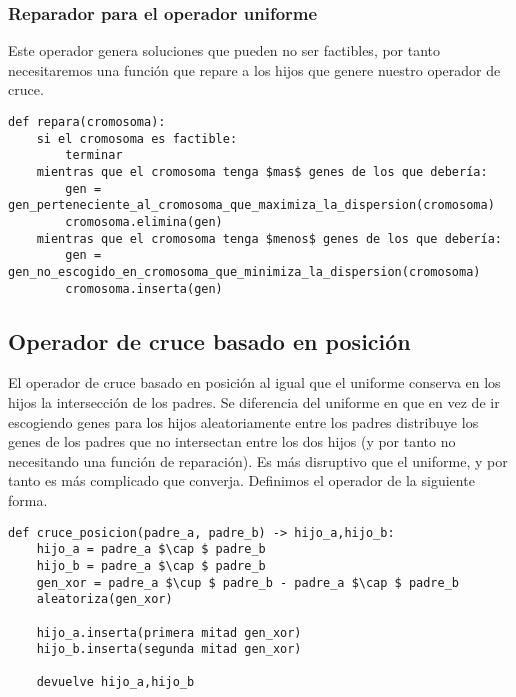 \begin{minipage}{\textwidth}

\subsubsection{Reparador para el operador uniforme}

Este operador genera soluciones que pueden no ser factibles, por tanto necesitaremos una función que repare a los hijos que genere
nuestro operador de cruce.

\begin{lstlisting}[mathescape=true,caption={Definición del operador de reparación para el operador de cruce uniforme.},captionpos=b]
def repara(cromosoma):
	si el cromosoma es factible:
		terminar
	mientras que el cromosoma tenga $mas$ genes de los que debería:
		gen = gen_perteneciente_al_cromosoma_que_maximiza_la_dispersion(cromosoma)
		cromosoma.elimina(gen)
	mientras que el cromosoma tenga $menos$ genes de los que debería:
		gen = gen_no_escogido_en_cromosoma_que_minimiza_la_dispersion(cromosoma)
		cromosoma.inserta(gen)
\end{lstlisting}
\end{minipage}

\subsection{Operador de cruce basado en posición}

El operador de cruce basado en posición al igual que el uniforme conserva en los hijos la intersección de los padres.
Se diferencia del uniforme en que en vez de ir escogiendo genes para los hijos aleatoriamente entre los padres distribuye
los genes de los padres que no intersectan entre los dos hijos (y por tanto no necesitando una función de reparación).
Es más disruptivo que el uniforme, y por tanto es más complicado que converja. \cite{Seminario3MH}
Definimos el operador de la siguiente forma.

\begin{minipage}{\textwidth}
\begin{lstlisting}[mathescape=true,caption={Definición del operador de cruce basado en posición.},captionpos=b]
def cruce_posicion(padre_a, padre_b) -> hijo_a,hijo_b:
	hijo_a = padre_a $\cap $ padre_b
	hijo_b = padre_a $\cap $ padre_b
	gen_xor = padre_a $\cup $ padre_b - padre_a $\cap $ padre_b
	aleatoriza(gen_xor)
	
	hijo_a.inserta(primera mitad gen_xor)
	hijo_b.inserta(segunda mitad gen_xor)

	devuelve hijo_a,hijo_b
\end{lstlisting}
\end{minipage}

